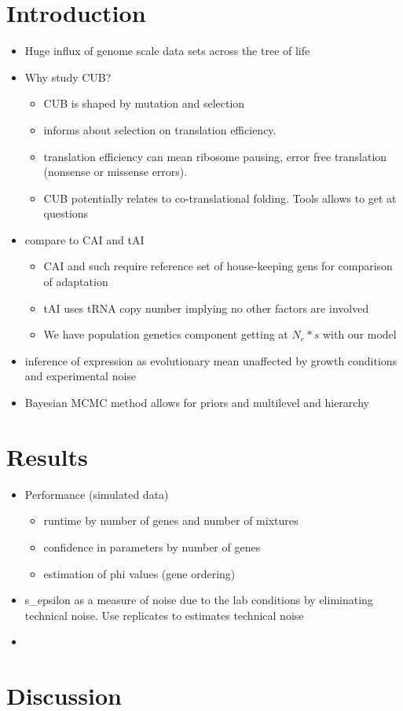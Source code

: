 \documentclass[12pt,draft]{article}
\begin{document}
\doublespacing
\linenumbers


\section*{Introduction}

\begin{itemize}
\item Huge influx of genome scale data sets across the tree of life
\item Why study CUB?
	\begin{itemize}
	\item CUB is shaped by mutation and selection
	\item informs about selection on translation efficiency.
	\item translation efficiency can mean ribosome pausing, error free translation (nonsense or missense errors).
	\item CUB potentially relates to co-translational folding. Tools allows to get at questions
	\end{itemize}
\item compare to CAI and tAI
	\begin{itemize}
	\item CAI and such require reference set of house-keeping gens for comparison of adaptation
	\item tAI uses tRNA copy number implying no other factors are involved
	\item We have population genetics component getting at $N_e * s$ with our model
	\end{itemize}
\item inference of expression as evolutionary mean unaffected by growth conditions and experimental noise
\item Bayesian MCMC method allows for priors and multilevel and hierarchy 
\end{itemize}



\section*{Results}
\begin{itemize}
\item Performance (simulated data)
	\begin{itemize}
	\item runtime by number of genes and number of mixtures
	\item confidence in parameters by number of genes
	\item estimation of phi values (gene ordering)
	\end{itemize}
\item s_epsilon as a measure of noise due to the lab conditions by eliminating technical 			noise. Use replicates to estimates technical noise

\item 
\end{itemize}


\section*{Discussion}
\end{document}
